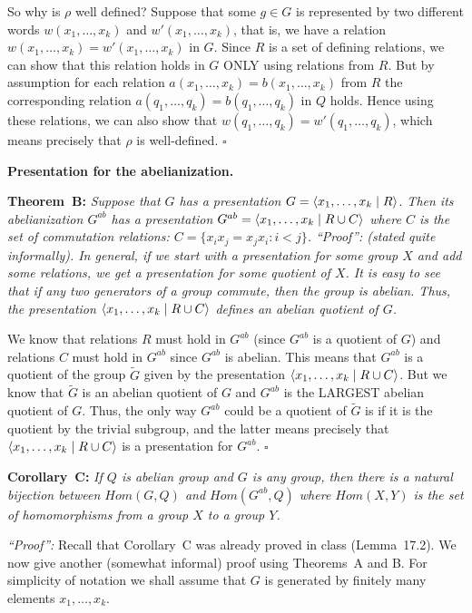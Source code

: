 \documentclass[12pt]{article}
\begin{document}
\sk So why is $\rho$ well defined? Suppose that some $g\in G$ is represented by two different words $w(x_1,\ldots, x_k)$
and $w'(x_1,\ldots, x_k)$, that is, we have a relation $w(x_1,\ldots, x_k)=w'(x_1,\ldots, x_k)$ in $G$. Since $R$ is a set of defining relations, we can show that this relation holds in $G$ ONLY using relations from $R$. But by assumption for each relation
$a(x_1,\ldots, x_k)=b(x_1,\ldots, x_k)$ from $R$ the corresponding relation $a(q_1,\ldots, q_k)=b(q_1,\ldots, q_k)$ in $Q$ holds. 
Hence using these relations, we can also show that $w(q_1,\ldots, q_k)=w'(q_1,\ldots, q_k)$, which means precisely that 
$\rho$ is well-defined.
$\square$
\skv
\centerline{\bf Presentation for the abelianization.}
\skv
{\bf Theorem~B: }\it Suppose that $G$ has a presentation $G={\langle} x_1,\ldots, x_k \mid R{\rangle}$. Then its abelianization 
$G^{ab}$ has a presentation $G^{ab}={\langle} x_1,\ldots, x_k \mid R\cup C{\rangle}$ where $C$ is the set of commutation relations:
$C=\{x_i x_j=x_j x_i: i<j\}$.
\skv
{\it ``Proof'': }\rm (stated quite informally). In general, if we start with a presentation for some group $X$ and add some relations, we get a presentation for some quotient of $X$. It is easy to see that if any two generators of a group commute, then the group is abelian. Thus, the presentation ${\langle} x_1,\ldots, x_k \mid R\cup C{\rangle}$ defines an abelian quotient of $G$. 

\sk We know that relations $R$ must hold in $G^{ab}$ (since $G^{ab}$ is a quotient of $G$) and relations $C$ must hold in $G^{ab}$
since $G^{ab}$ is abelian. This means that $G^{ab}$ is a quotient of the group $\widetilde G$ given by the presentation  ${\langle} x_1,\ldots, x_k \mid R\cup C{\rangle}$. But we know that $\widetilde G$ is an abelian quotient of $G$ and $G^{ab}$ is the LARGEST abelian quotient of $G$. Thus, the only way $G^{ab}$ could be a quotient of $\widetilde G$ is if it is the quotient by the trivial subgroup,
and the latter means precisely that ${\langle} x_1,\ldots, x_k \mid R\cup C{\rangle}$ is a presentation for $G^{ab}$.
$\square$


\skv
{\bf Corollary~C: }\it If $Q$ is abelian group and $G$ is any group, then there is a natural bijection between $Hom(G,Q)$
and $Hom(G^{ab},Q)$ where $Hom(X,Y)$ is the set of homomorphisms from a group $X$ to a group $Y$.

{\it ``Proof'': }\rm
Recall that Corollary~C was already proved in class (Lemma~17.2). We now give another (somewhat informal) proof using Theorems~A and B. For simplicity of notation we shall assume that $G$ is generated by finitely many elements $x_1,\ldots, x_k$.
\end{document}
